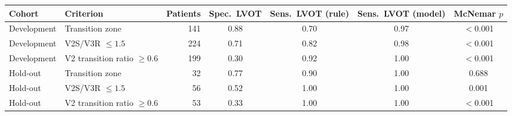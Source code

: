 \begin{tabular}{llrcccc}
\toprule
Cohort & Criterion & Patients & Spec.\ LVOT & Sens.\ LVOT (rule) & Sens.\ LVOT (model) & McNemar $p$ \\
\midrule
Development & Transition zone & 141 & 0.88 & 0.70 & 0.97 & $<$0.001 \\
Development & V2S/V3R $\leq 1.5$ & 224 & 0.71 & 0.82 & 0.98 & $<$0.001 \\
Development & V2 transition ratio $\geq 0.6$ & 199 & 0.30 & 0.92 & 1.00 & $<$0.001 \\
Hold-out & Transition zone & 32 & 0.77 & 0.90 & 1.00 & 0.688 \\
Hold-out & V2S/V3R $\leq 1.5$ & 56 & 0.52 & 1.00 & 1.00 & 0.001 \\
Hold-out & V2 transition ratio $\geq 0.6$ & 53 & 0.33 & 1.00 & 1.00 & $<$0.001 \\
\bottomrule
\end{tabular}
